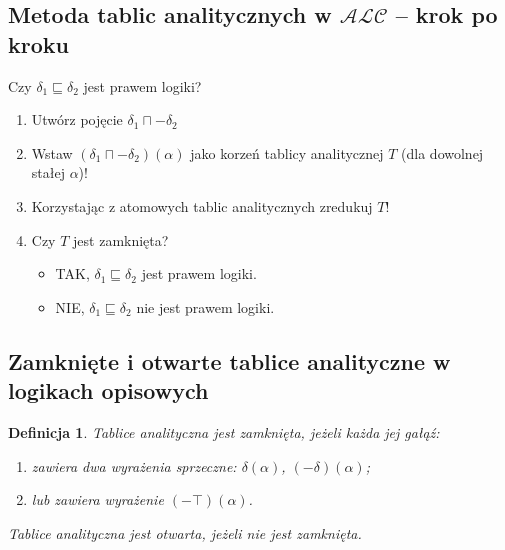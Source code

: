 \documentclass[12pt]{article}
\newtheorem{definicja}{Definicja}
\begin{document}
\subsection{Metoda tablic analitycznych w $\mathcal{ALC}$ -- krok po kroku}
Czy $\delta_{1} \sqsubseteq \delta_{2}$ jest prawem logiki?
%
\begin{enumerate}
\item Utwórz pojęcie  $\delta_1 \sqcap - \delta_2$
%
\item Wstaw $(\delta_1 \sqcap - \delta_2)(\alpha)$ jako korzeń tablicy analitycznej $T$ (dla dowolnej stałej $\alpha$)!
%
\item Korzystając z atomowych tablic analitycznych zredukuj $T$!
%
\item Czy $T$ jest zamknięta?
%
\begin{itemize}
\item \textcolor[rgb]{0.00,1.00,0.00}{TAK}, $\delta_{1} \sqsubseteq \delta_{2}$ \textcolor[rgb]{0.00,1.00,0.00}{jest} prawem logiki.
%
\item \textcolor[rgb]{1.00,0.00,0.00}{NIE}, $\delta_{1} \sqsubseteq \delta_{2}$ \textcolor[rgb]{0.98,0.00,0.00}{nie jest} prawem logiki.
\end{itemize}
\end{enumerate}
%

\subsection{Zamknięte i otwarte tablice analityczne w logikach opisowych}
%
\begin{definicja}
Tablice analityczna jest \emph{zamknięta}, jeżeli każda jej gałąź:
\begin{enumerate}
\item zawiera dwa wyrażenia sprzeczne: $\delta(\alpha)$, $(- \delta)(\alpha)$;
\item lub zawiera wyrażenie $(- \top)(\alpha)$.
\end{enumerate}
Tablice analityczna jest \emph{otwarta}, jeżeli nie jest zamknięta.
\end{definicja}
%

\end{document}
